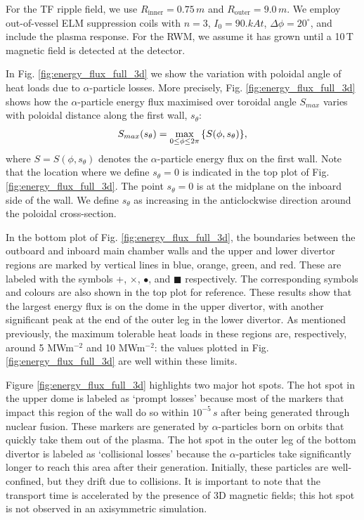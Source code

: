 \documentclass[10pt, a4paper, twoside]{article}
\begin{document}
For the TF ripple field, we use $R_{\text{inner}} = 0.75\,\si{m}$ and $R_{\text{outer}} = 9.0\,\si{m}$. We employ out-of-vessel ELM suppression coils with $n=3$, $I_0= \si{90.kAt}$, $\Delta \phi = 20^\circ$, and include the plasma response. For the RWM, we assume it has grown until a 10\,T magnetic field is detected at the detector.

In Fig. \ref{fig:energy_flux_full_3d} we show the variation with poloidal angle of heat loads due to $\alpha$-particle losses. More precisely, Fig. \ref{fig:energy_flux_full_3d} shows how the $\alpha$-particle energy flux maximised over toroidal angle $S_{max}$ varies with poloidal distance along the first wall, $s_\theta$:
\begin{equation}
    \label{eq:max_alpha_particle_energy_flux}
    S_{max}(s_\theta) = \max_{0\le \phi \le 2\pi}\qty{S(\phi, s_\theta)},
\end{equation}
where $S=S(\phi, s_\theta)$ denotes the $\alpha$-particle energy flux on the first wall. Note that the location where we define \( s_\theta = 0 \) is indicated in the top plot of Fig. \ref{fig:energy_flux_full_3d}. The point \( s_\theta = 0 \) is at the midplane on the inboard side of the wall. We define \( s_\theta \) as increasing in the anticlockwise direction around the poloidal cross-section.

In the bottom plot of Fig. \ref{fig:energy_flux_full_3d}, the boundaries between the outboard and inboard main chamber walls and the upper and lower divertor regions are marked by vertical lines in blue, orange, green, and red. These are labeled with the symbols +, $\times$, $\bullet$, and $\blacksquare$ respectively. The corresponding symbols and colours are also shown in the top plot for reference. These results show that the largest energy flux is on the dome in the upper divertor, with another significant peak at the end of the outer leg in the lower divertor. As mentioned previously, the maximum tolerable heat loads in these regions are, respectively, around 5 MWm$^{-2}$ and 10 MWm$^{-2}$: the values plotted in Fig. \ref{fig:energy_flux_full_3d} are well within these limits. 

Figure \ref{fig:energy_flux_full_3d} highlights two major hot spots. The hot spot in the upper dome is labeled as `prompt losses' because most of the markers that impact this region of the wall do so within \(10^{-5}\,\si{s}\) after being generated through nuclear fusion. These markers are generated by $\alpha$-particles born on orbits that quickly take them out of the plasma. The hot spot in the outer leg of the bottom divertor is labeled as `collisional losses' because the $\alpha$-particles take significantly longer to reach this area after their generation. Initially, these particles are well-confined, but they drift due to collisions. It is important to note that the transport time is accelerated by the presence of 3D magnetic fields; this hot spot is not observed in an axisymmetric simulation.
\end{document}
